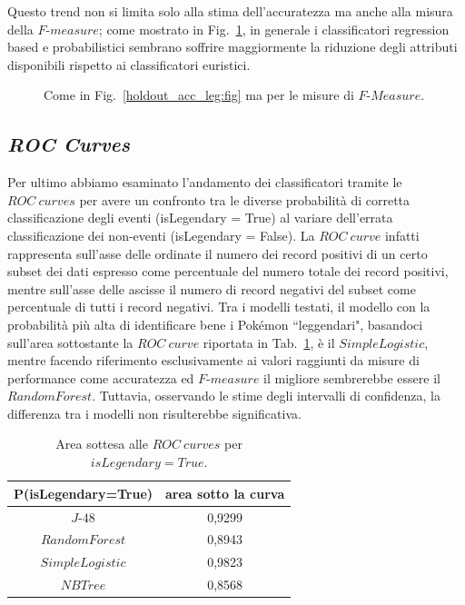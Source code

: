 \documentclass[fleqn,10pt]{SelfArx} %
\begin{document}
Questo trend non si limita solo alla stima dell'accuratezza ma anche alla misura della $F$-$measure$; come mostrato in Fig.~\ref{fmeas_leg:fig}, in generale i classificatori regression based e probabilistici sembrano soffrire maggiormente la riduzione degli attributi disponibili rispetto ai classificatori euristici.
\begin{figure}
\caption{\label{fmeas_leg:fig} Come in Fig.~\ref{holdout_acc_leg:fig} ma per le misure di $F$-$Measure$.}
\end{figure}

\subsection{\textit{ROC Curves}}
Per ultimo abbiamo esaminato l'andamento dei classificatori tramite le $ROC\ curves$ per avere un confronto tra le diverse probabilità di corretta classificazione degli eventi (isLegendary = True) al variare dell'errata classificazione dei non-eventi (isLegendary = False). La $ROC\ curve$ infatti rappresenta sull'asse delle ordinate il numero dei record positivi di un certo subset dei dati espresso come percentuale del numero totale dei record positivi, mentre sull'asse delle ascisse il numero di record negativi del subset come percentuale di tutti i record negativi. Tra i modelli testati, il modello con la probabilità più alta di identificare bene i Pokémon ``leggendari", basandoci sull'area sottostante la $ROC\ curve$ riportata in Tab.~\ref{Roc_leg:tab}, è il $SimpleLogistic$, mentre facendo riferimento esclusivamente ai valori raggiunti da misure di performance come accuratezza ed $F$-$measure$ il migliore sembrerebbe essere il $RandomForest$. Tuttavia, osservando le stime degli intervalli di confidenza, la differenza tra i modelli non risulterebbe significativa.

\begin{table}
\begin{center}
\begin {tabular}{c | c }
\hline
\hline
P(isLegendary=True) & area sotto la curva\\
\hline
 $J$-$48$ & 0,9299\\
$RandomForest$& 0,8943\\
$SimpleLogistic$&0,9823\\
$NBTree$&0,8568\\
\hline
\hline
\end{tabular}
\end{center}
\caption{\label{Roc_leg:tab}
Area sottesa alle $ROC\ curves$ per $isLegendary=True$.}
\end{table}
\newpage
\end{document}
